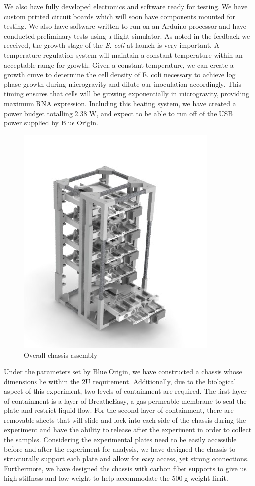 \documentclass[twocolumn]{article}
\begin{document}
We also have fully developed electronics and software ready for testing. We have custom printed circuit boards which will soon have components mounted for testing. We also have software written to run on an Arduino processor and have conducted preliminary tests using a flight simulator. As noted in the feedback we received, the growth stage of the \emph{E. coli} at launch is very important. A temperature regulation system will maintain a constant temperature within an acceptable range for growth. Given a constant temperature, we can create a growth curve to determine the cell density of E. coli necessary to achieve log phase growth during microgravity and dilute our inoculation accordingly. This timing ensures that cells will be growing exponentially in microgravity, providing maximum RNA expression. Including this heating system, we have created a power budget totalling 2.38 W, and expect to be able to run off of the USB power supplied by Blue Origin.
\vspace{-7mm}
\begin{figure}[h]
    \centering
    \includegraphics[scale = 0.6]{images/Chassis.JPG}
    \caption{Overall chassis assembly}
    \label{fig:my_label}
\end{figure}

Under the parameters set by Blue Origin, we have constructed a chassis whose dimensions lie within the 2U requirement. Additionally, due to the biological aspect of this experiment, two levels of containment are required. The first layer of containment is a layer of BreatheEasy, a gas-permeable membrane to seal the plate and restrict liquid flow. For the second layer of containment, there are removable sheets that will slide and lock into each side of the chassis during the experiment and have the ability to release after the experiment in order to collect the samples. Considering the experimental plates need to be easily accessible before and after the experiment for analysis, we have designed the chassis to structurally support each plate and allow for easy access, yet strong connections. Furthermore, we have designed the chassis with carbon fiber supports to give us high stiffness and low weight to help accommodate the 500 g weight limit.
\end{document}
